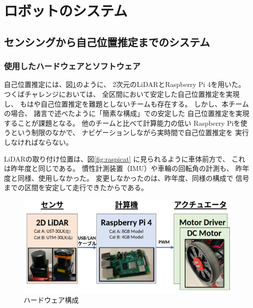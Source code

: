 \documentclass[twocolumn,9pt]{jsproceedings}
\begin{document}
\section{ロボットのシステム}

\subsection{センシングから自己位置推定までのシステム}\label{sub:localization}

\subsubsection{使用したハードウェアとソフトウェア}


自己位置推定には、図\ref{fig:hardware}のように、
2次元のLiDARとRaspberry Pi 4を用いた。
つくばチャレンジにおいては、
全区間において安定した自己位置推定を実現し、
もはや自己位置推定を難題としないチームも存在する。
しかし、本チームの場合、
諸言で述べたように「簡素な構成」での安定した
自己位置推定を実現することが課題となる。
他のチームと比べて計算能力の低い
Raspberry Piを使うという制限のなかで、
ナビゲーションしながら実時間で自己位置推定を
実行しなければならない。


LiDARの取り付け位置は、図\ref{fig:raspicat}
に見られるように車体前方で、
これは昨年度\cite{池邉2021}と同じである。
慣性計測装置（IMU）や車輪の回転角の計測も、
昨年度と同様、使用しなかった。
変更しなかったのは、昨年度、同様の構成で
信号までの区間を安定して走行できたからである。

\begin{figure}[h]
  \begin{center}
    \includegraphics[width=1.0\linewidth]{figs/hardware.pdf}
    \caption{ハードウェア構成}
    \label{fig:hardware}
  \end{center}
\end{figure}
\end{document}
